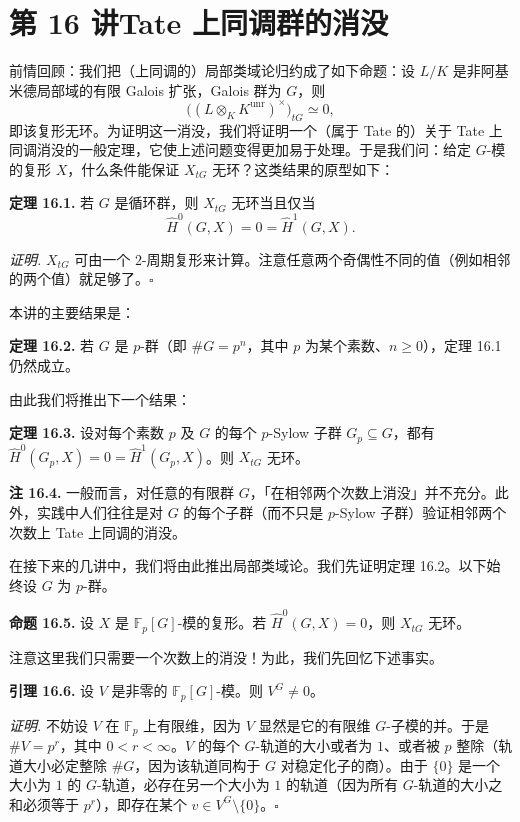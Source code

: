 \section*{第 16 讲\quad Tate 上同调群的消没}

前情回顾：我们把（上同调的）局部类域论归约成了如下命题：设 $L/K$ 是非阿基米德局部域的有限 Galois 扩张，Galois 群为 $G$，则
\[
\big((L\otimes_K K^{\mathrm{unr}})^\times\big)_{tG}\simeq 0,
\]
即该复形无环。为证明这一消没，我们将证明一个（属于 Tate 的）关于 Tate 上同调消没的一般定理，它使上述问题变得更加易于处理。于是我们问：给定 $G$-模的复形 $X$，什么条件能保证 $X_{tG}$ 无环？这类结果的原型如下：

\textbf{定理 16.1.} 若 $G$ 是循环群，则 $X_{tG}$ 无环当且仅当
\[
\widehat H^0(G,X)=0=\widehat H^1(G,X).
\]

\textit{证明.} $X_{tG}$ 可由一个 $2$-周期复形来计算。注意任意两个奇偶性不同的值（例如相邻的两个值）就足够了。\hfill$\square$

本讲的主要结果是：

\textbf{定理 16.2.} 若 $G$ 是 $p$-群（即 $\#G=p^n$，其中 $p$ 为某个素数、$n\ge 0$），定理 16.1 仍然成立。

由此我们将推出下一个结果：

\textbf{定理 16.3.} 设对每个素数 $p$ 及 $G$ 的每个 $p$-Sylow 子群 $G_p\subseteq G$，都有 $\widehat H^0(G_p,X)=0=\widehat H^1(G_p,X)$。则 $X_{tG}$ 无环。

\textbf{注 16.4.} 一般而言，对任意的有限群 $G$，「在相邻两个次数上消没」并不充分。此外，实践中人们往往是对 $G$ 的每个子群（而不只是 $p$-Sylow 子群）验证相邻两个次数上 Tate 上同调的消没。

在接下来的几讲中，我们将由此推出局部类域论。我们先证明定理 16.2。以下始终设 $G$ 为 $p$-群。

\textbf{命题 16.5.} 设 $X$ 是 $\mathbb F_p[G]$-模的复形。若 $\widehat H^0(G,X)=0$，则 $X_{tG}$ 无环。

注意这里我们只需要一个次数上的消没！为此，我们先回忆下述事实。

\textbf{引理 16.6.} 设 $V$ 是非零的 $\mathbb F_p[G]$-模。则 $V^G\neq 0$。

\textit{证明.} 不妨设 $V$ 在 $\mathbb F_p$ 上有限维，因为 $V$ 显然是它的有限维 $G$-子模的并。于是 $\#V=p^r$，其中 $0<r<\infty$。$V$ 的每个 $G$-轨道的大小或者为 $1$、或者被 $p$ 整除（轨道大小必定整除 $\#G$，因为该轨道同构于 $G$ 对稳定化子的商）。由于 $\{0\}$ 是一个大小为 $1$ 的 $G$-轨道，必存在另一个大小为 $1$ 的轨道（因为所有 $G$-轨道的大小之和必须等于 $p^r$），即存在某个 $v\in V^G\setminus\{0\}$。\hfill$\square$

